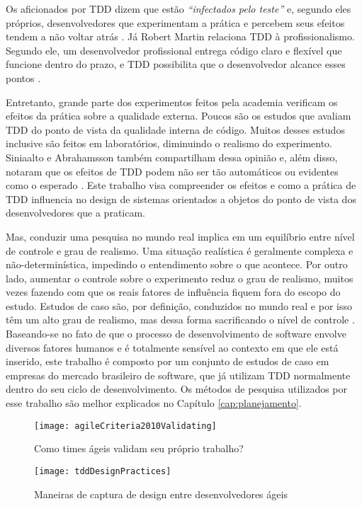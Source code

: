 Os aficionados por TDD dizem que estão \textit{``infectados pelo teste''}  e,
segundo eles próprios, desenvolvedores que experimentam a prática e percebem
seus efeitos tendem a não voltar atrás \cite{tdd-fearless}.
Já Robert Martin relaciona TDD à profissionalismo. Segundo ele, um desenvolvedor
profissional entrega código claro e flexível que funcione dentro do prazo, e TDD
possibilita que o desenvolvedor alcance esses pontos \cite{martin-profissionalismo}.

Entretanto, grande parte dos experimentos feitos pela academia verificam os
efeitos da prática sobre a qualidade externa. Poucos são os estudos que avaliam TDD do
ponto de vista da qualidade interna de código. Muitos desses estudos
inclusive são feitos em laboratórios, diminuindo o realismo do experimento. 
Siniaalto e Abrahamsson também
compartilham dessa opinião e, além disso, notaram que os efeitos de TDD podem 
não ser tão automáticos ou evidentes como o esperado \cite{alarming-results}.
Este trabalho visa compreender os efeitos e como a prática de TDD
influencia no design de sistemas orientados a objetos do ponto de vista dos
desenvolvedores que a praticam.

Mas, conduzir uma pesquisa no mundo real implica em um equilíbrio entre nível de
controle e grau de realismo. Uma situação realística é geralmente complexa e 
não-determinística, impedindo o entendimento sobre o que acontece. Por outro
lado, aumentar o controle sobre o experimento reduz o grau de realismo, muitos
vezes fazendo com que os reais fatores de influência fiquem fora do escopo do 
estudo. Estudos de caso são, por definição, conduzidos no mundo real e por isso 
têm um alto grau de realismo, mas dessa forma sacrificando o nível de  controle
\cite{guidelines-case-study}.
Baseando-se no fato de que o processo de desenvolvimento de software envolve 
diversos fatores humanos e é totalmente sensível ao contexto em que ele está 
inserido, este trabalho é composto por um conjunto de estudos de caso em
empresas do mercado brasileiro de software, que já utilizam TDD normalmente
dentro do seu ciclo de desenvolvimento. Os métodos de pesquisa utilizados por
esse trabalho são melhor explicados no Capítulo \ref{cap:planejamento}.

\begin{figure}[ht]
  \begin{minipage}[b]{0.45\linewidth}
    \centering
    \texttt{[image: agileCriteria2010Validating]}
    \caption{Como times ágeis validam seu próprio trabalho?}
    \label{fig:wambler-agile-2010}
  \end{minipage}
  \hspace{0.5cm}
  \begin{minipage}[b]{0.45\linewidth}
    \centering
    \texttt{[image: tddDesignPractices]}
    \caption{Maneiras de captura de design entre desenvolvedores ágeis}  
    \label{fig:wambler-tdd-2008}
  \end{minipage}
\end{figure}			

